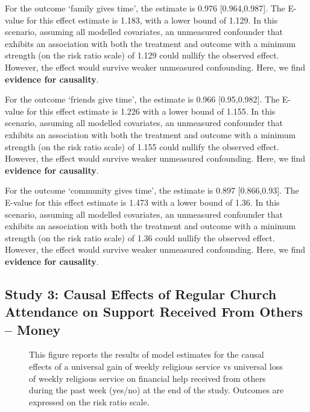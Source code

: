 \documentclass[
  single column]{article}
\begin{document}
\newpage{}

For the outcome `family gives time', the estimate is 0.976
{[}0.964,0.987{]}. The E-value for this effect estimate is 1.183, with a
lower bound of 1.129. In this scenario, assuming all modelled
covariates, an unmeasured confounder that exhibits an association with
both the treatment and outcome with a minimum strength (on the risk
ratio scale) of 1.129 could nullify the observed effect. However, the
effect would survive weaker unmeasured confounding. Here, we find
\textbf{evidence for causality}.

For the outcome `friends give time', the estimate is 0.966
{[}0.95,0.982{]}. The E-value for this effect estimate is 1.226 with a
lower bound of 1.155. In this scenario, assuming all modelled
covariates, an unmeasured confounder that exhibits an association with
both the treatment and outcome with a minimum strength (on the risk
ratio scale) of 1.155 could nullify the observed effect. However, the
effect would survive weaker unmeasured confounding. Here, we find
\textbf{evidence for causality}.

For the outcome `community gives time', the estimate is 0.897
{[}0.866,0.93{]}. The E-value for this effect estimate is 1.473 with a
lower bound of 1.36. In this scenario, assuming all modelled covariates,
an unmeasured confounder that exhibits an association with both the
treatment and outcome with a minimum strength (on the risk ratio scale)
of 1.36 could nullify the observed effect. However, the effect would
survive weaker unmeasured confounding. Here, we find \textbf{evidence
for causality}.

\newpage{}

\subsection{Study 3: Causal Effects of Regular Church Attendance on
Support Received From Others --
Money}\label{study-3-causal-effects-of-regular-church-attendance-on-support-received-from-others-money}

\begin{figure}


\caption{\label{fig-3_1}This figure reports the results of model
estimates for the causal effects of a universal gain of weekly religious
service vs universal loss of weekly religious service on financial help
received from others during the past week (yes/no) at the end of the
study. Outcomes are expressed on the risk ratio scale.}

\end{figure}%
\end{document}
